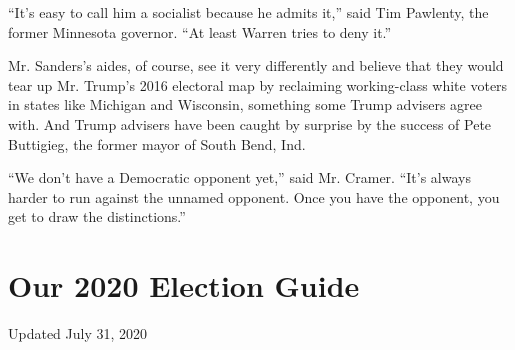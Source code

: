 ``It's easy to call him a socialist because he admits it,'' said Tim
Pawlenty, the former Minnesota governor. ``At least Warren tries to deny
it.''

Mr. Sanders's aides, of course, see it very differently and believe that
they would tear up Mr. Trump's 2016 electoral map by reclaiming
working-class white voters in states like Michigan and Wisconsin,
something some Trump advisers agree with. And Trump advisers have been
caught by surprise by the success of Pete Buttigieg, the former mayor of
South Bend, Ind.

``We don't have a Democratic opponent yet,'' said Mr. Cramer. ``It's
always harder to run against the unnamed opponent. Once you have the
opponent, you get to draw the distinctions.''

\hypertarget{our-2020-election-guide}{%
\section{Our 2020 Election Guide}\label{our-2020-election-guide}}

Updated July 31, 2020

